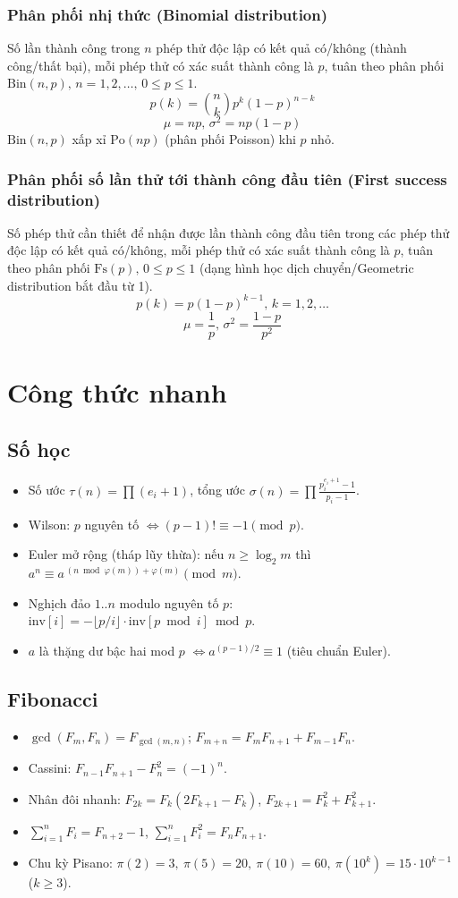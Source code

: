 \subsubsection{Phân phối nhị thức (Binomial distribution)}
Số lần thành công trong $n$ phép thử độc lập có kết quả có/không (thành công/thất bại), mỗi phép thử có xác suất thành công là $p$, tuân theo phân phối $\textrm{Bin}(n,p),\,n=1,2,\dots,\, 0\leq p\leq1$.
\[p(k)=\binom{n}{k}p^k(1-p)^{n-k}\]
\[\mu = np,\,\sigma^2=np(1-p)\]
$\textrm{Bin}(n,p)$ xấp xỉ $\textrm{Po}(np)$ (phân phối Poisson) khi $p$ nhỏ.

\subsubsection{Phân phối số lần thử tới thành công đầu tiên (First success distribution)}
Số phép thử cần thiết để nhận được lần thành công đầu tiên trong các phép thử độc lập có kết quả có/không, mỗi phép thử có xác suất thành công là $p$, tuân theo phân phối $\textrm{Fs}(p),\,0\leq p\leq1$ (dạng hình học dịch chuyển/Geometric distribution bắt đầu từ 1).
\[p(k)=p(1-p)^{k-1},\,k=1,2,\dots\]
\[\mu = \frac1p,\,\sigma^2=\frac{1-p}{p^2}\]

\section{Công thức nhanh}

\subsection{Số học}
\begin{itemize}
\item Số ước $\tau(n)=\prod(e_i+1)$, tổng ước $\sigma(n)=\prod\frac{p_i^{e_i+1}-1}{p_i-1}$.
\item Wilson: $p$ nguyên tố $\iff (p-1)!\equiv -1 \pmod p$.
\item Euler mở rộng (tháp lũy thừa): nếu $n\ge\log_2 m$ thì
      $a^n\equiv a^{\,(n \bmod \varphi(m))+\varphi(m)} \pmod m$.
\item Nghịch đảo $1..n$ modulo nguyên tố $p$:
      $\mathrm{inv}[i]=-\lfloor p/i\rfloor\cdot \mathrm{inv}[p\bmod i] \bmod p$.
\item $a$ là thặng dư bậc hai mod $p$ $\iff a^{(p-1)/2}\equiv 1$ (tiêu chuẩn Euler).
\end{itemize}

\subsection{Fibonacci}
\begin{itemize}
\item $\gcd(F_m,F_n)=F_{\gcd(m,n)}$; $F_{m+n}=F_mF_{n+1}+F_{m-1}F_n$.
\item Cassini: $F_{n-1}F_{n+1}-F_n^2=(-1)^n$.
\item Nhân đôi nhanh: $F_{2k}=F_k(2F_{k+1}-F_k)$, $F_{2k+1}=F_k^2+F_{k+1}^2$.
\item $\sum_{i=1}^n F_i=F_{n+2}-1$, $\sum_{i=1}^n F_i^2=F_nF_{n+1}$.
\item Chu kỳ Pisano: $\pi(2)=3,\ \pi(5)=20,\ \pi(10)=60,\ \pi(10^k)=15\cdot10^{k-1}$ ($k\ge3$).
\end{itemize}

